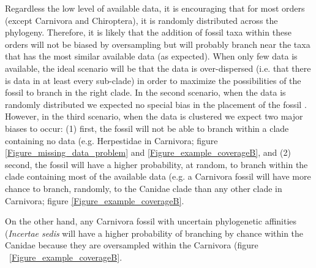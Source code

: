 \documentclass[12pt,letterpaper]{article}
\renewcommand{\subsection}[1]{%
\bigskip
\begin{center}
\begin{large}
\normalfont\itshape #1
\end{large}
\end{center}}
\begin{document}
Regardless the low level of available data, it is encouraging that for most orders (except Carnivora and Chiroptera), it is randomly distributed across the phylogeny.
Therefore, it is likely that the addition of fossil taxa within these orders will not be biased by oversampling but will probably branch near the taxa that has the most similar available data (as expected).
When only few data is available, the ideal scenario will be that the data is over-dispersed (i.e.
that there is data in at least every sub-clade) in order to maximize the possibilities of the fossil to branch in the right clade.
In the second scenario, when the data is randomly distributed we expected no special bias in the placement of the fossil \citep{GuillermeCooper}.
However, in the third scenario, when the data is clustered we expect two major biases to occur: (1) first, the fossil will not be able to branch within a clade containing no data (e.g.
Herpestidae in Carnivora; figure \ref{Figure_missing_data_problem} and \ref{Figure_example_coverageB}, and (2) second, the fossil will have a higher probability, at random, to branch within the clade containing most of the available data (e.g.
a Carnivora fossil will have more chance to branch, randomly, to the Canidae clade than any other clade in Carnivora; figure \ref{Figure_example_coverageB}.

On the other hand, any Carnivora fossil with uncertain phylogenetic affinities (\textit{Incertae sedis} will have a higher probability of branching by chance within the Canidae because they are oversampled within the Carnivora (figure ~\ref{Figure_example_coverageB}.
\end{document}
